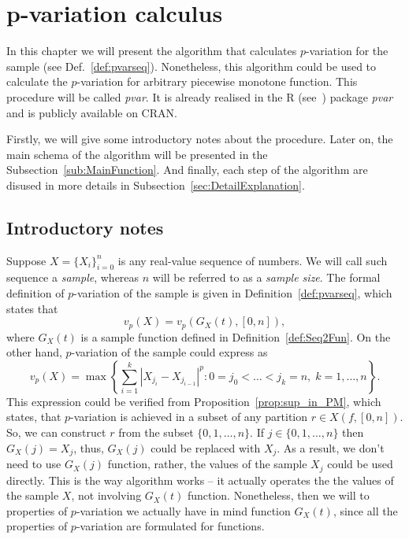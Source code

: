 \documentclass[12pt, a4paper]{article}
\numberwithin{equation}{section}
\begin{document}
\section{p-variation calculus}  
  
In this chapter we will present the algorithm that calculates 
$p$-variation for the sample (see Def.~\ref{def:pvarseq}). 
Nonetheless, this algorithm could be used to calculate
the $p$-variation for arbitrary piecewise monotone function. 
This procedure will be called \emph{pvar}. 
It is already realised in the R (see~\cite{R}) package \emph{pvar} and
is publicly available on CRAN\footnotemark.

Firstly, we will give some introductory notes about the
procedure. Later on, the main schema of the
algorithm will be presented in the
Subsection~\ref{sub:MainFunction}. And finally, 
each step of the algorithm are disused in more details in 
Subsection~\ref{sec:DetailExplanation}.

\subsection{Introductory notes}


Suppose $X=\{X_{i}\}_{i=0}^{n}$ is any real-value sequence of numbers. 
We will call such sequence a \emph{sample}, 
whereas $n$ will be referred to as a \emph{sample size}.
The formal definition of $p$-variation 
of the sample is given in Definition~\ref{def:pvarseq}, 
which states that
\begin{equation}
  v_p(X) = v_p(G_X(t),[0,n]),
\end{equation}
where $G_X(t)$ is a sample function defined in  
Definition~\ref{def:Seq2Fun}.
On the other hand, 
$p$-variation of the sample could express as
\begin{equation}
  v_p(X) = \max\left\{ \sum_{i=1}^k |X_{j_i} - X_{j_{i-1}}|^p :
  0=j_0<\dots<j_k=n,\; k=1,\dots,n  \right\}.
\end{equation}
This expression could be verified from
Proposition~\ref{prop:sup_in_PM},
which states, that $p$-variation
is achieved in a subset of any partition $r \in X(f, [0,n])$.
So, we can construct $r$ from the subset $\{0, 1, \dots, n\}$. 
If $j \in \{0, 1, \dots, n\}$ then $G_X(j) = X_j$, thus,
$G_X(j)$ could be replaced with $X_j$. As a result,
we don't need to use $G_X(j)$ function, rather, 
the values of the sample $X_j$ could be used directly. 
This is the way algorithm works --
it actually operates the the values of the sample $X$,
not involving $G_X(t)$ function. Nonetheless,
then we will to properties of $p$-variation
we actually have in mind function $G_X(t)$, since all
the properties of $p$-variation are formulated for functions.
\end{document}
